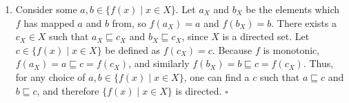 \begin{enumerate}
    \item Consider some $a, b \in \{f(x) \mid x \in X\}$.
    Let $a_X$ and $b_X$ be the elements which $f$ has mapped $a$ and $b$ from, so $f(a_X) = a$ and $f(b_X) = b$.
    There exists a $c_X \in X$ such that $a_X \sqsubseteq c_X$ and $b_X \sqsubseteq c_X$, since $X$ is a directed set.
    Let $c \in \{f(x) \mid x \in X\}$ be defined as $f(c_X) = c$. 
    Because $f$ is monotonic, $f(a_X) = a \sqsubseteq c = f(c_X)$, and similarly $f(b_X) = b \sqsubseteq c = f(c_X)$. Thus, for any choice of $a, b \in \{f(x) \mid x \in X\}$, one can find a $c$ such that $a \sqsubseteq c$ and $b \sqsubseteq c$, and therefore $\{f(x) \mid x \in X\}$ is directed.
    $\square$
    
\end{enumerate}
